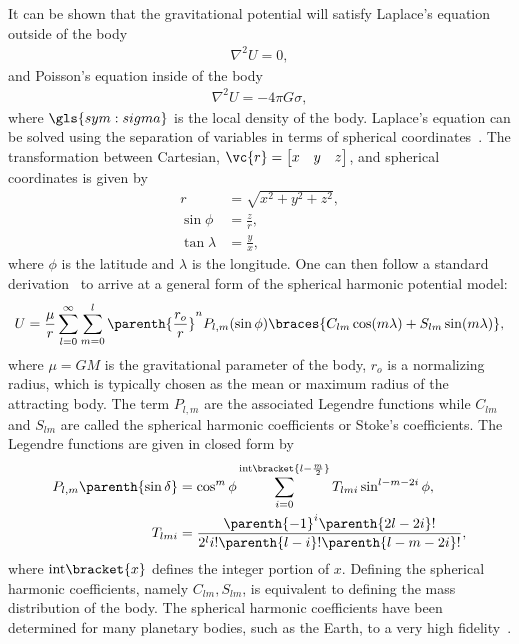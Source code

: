 It can be shown that the gravitational potential will satisfy Laplace's equation outside of the body
\begin{align}\label{eq:laplace_equation}
    \nabla^2 U = 0,
\end{align}
and Poisson's equation inside of the body
\begin{align}\label{eq:poisson_equation}
    \nabla^2 U = - 4 \pi G \sigma,
\end{align}
where \( \gls{sym:sigma} \) is the local density of the body.
Laplace's equation can be solved using the separation of variables in terms of spherical coordinates~\cite{scheeres2012a}.
The transformation between Cartesian, \( \vc{r} = \begin{bmatrix} x & y & z \end{bmatrix}\), and spherical coordinates is given by
\begin{subequations}
    \begin{align*}
        r &= \sqrt{x^2 + y^2 + z^2}, \\
        \sin \phi &= \frac{z}{r}, \\
        \tan \lambda &= \frac{y}{x},
    \end{align*}
\end{subequations}
where \( \phi \) is the latitude and \( \lambda\) is the longitude.
One can then follow a standard derivation~\cite{vallado2007} to arrive at a general form of the spherical harmonic potential model:
\begin{align}\label{eq:spherical_harmonic}
    U = \frac{\mu}{r} \sum_{l=0}^\infty \sum_{m=0}^l \parenth{\frac{r_o}{r}}^n P_{l, m}(\sin \phi) \braces{ C_{lm} \cos(m \lambda) + S_{lm} \sin(m \lambda)},
\end{align}
where \( \mu = G M \) is the gravitational parameter of the body, \( r_o\) is a normalizing radius, which is typically chosen as the mean or maximum radius of the attracting body.
The term \( P_{l, m} \) are the associated Legendre functions while \( C_{lm}\) and \( S_{lm}\) are called the spherical harmonic coefficients or Stoke's coefficients. 
The Legendre functions are given in closed form by~\cite{scheeres2012}
\begin{subequations}
\begin{align}
    P_{l, m} \parenth{ \sin \delta} &= \cos^m \phi \sum_{i = 0}^{\text{int}\bracket{l - \frac{m}{2}}} T_{lmi} \sin^{l - m - 2i} \phi ,  \\
T_{lmi} &= \frac{\parenth{-1}^i\parenth{2l - 2i}!}{2^l i! \parenth{l - i}!\parenth{l - m- 2i}!},
\end{align}
\end{subequations}
where \( \text{int}\bracket{x}\) defines the integer portion of \( x \).
Defining the spherical harmonic coefficients, namely \( C_{lm}, S_{lm}\), is equivalent to defining the mass distribution of the body.
The spherical harmonic coefficients have been determined for many planetary bodies, such as the Earth, to a very high fidelity~\cite{vallado2007,pavlis2012}.

